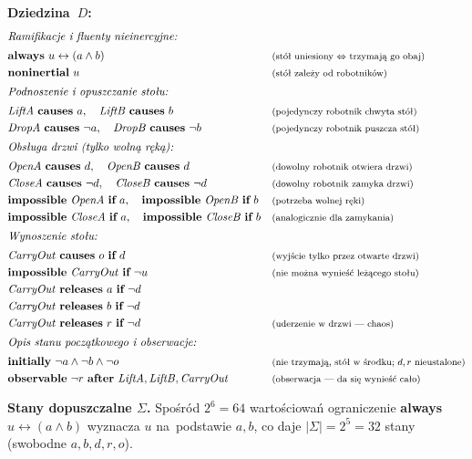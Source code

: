 \documentclass[11pt,a4paper]{article}
\newcommand{\causes}{\textbf{causes}}
\newcommand{\aft}{\textbf{after}}
\renewcommand{\iff}{\textbf{if}}
\newcommand{\initially}{\textbf{initially}}
\newcommand{\always}{\textbf{always}}
\newcommand{\impossible}{\textbf{impossible}}
\newcommand{\releases}{\textbf{releases}}
\newcommand{\noninertial}{\textbf{noninertial}}
\newcommand{\observable}{\textbf{observable}}
\newcommand{\cmt}[1]{\text{\footnotesize\normalfont (#1)}}
\theoremstyle{definition}
\begin{document}
\medskip
\noindent\textbf{Dziedzina~$D$:}
{\small
\begin{align*}
  \shortintertext{\textit{Ramifikacje i~fluenty nieinercyjne:}}
  &\always\ u \leftrightarrow (a \land b)
    && \cmt{stół uniesiony $\Leftrightarrow$ trzymają go obaj} \\
  &\noninertial\ u
    && \cmt{stół zależy od~robotników} \\
  \shortintertext{\textit{Podnoszenie i~opuszczanie stołu:}}
  &\mathit{LiftA}\ \causes\ a,
   \quad \mathit{LiftB}\ \causes\ b
    && \cmt{pojedynczy robotnik chwyta stół} \\
  &\mathit{DropA}\ \causes\ \neg a,
   \quad \mathit{DropB}\ \causes\ \neg b
    && \cmt{pojedynczy robotnik puszcza stół} \\
  \shortintertext{\textit{Obsługa drzwi (tylko wolną ręką):}}
  &\mathit{OpenA}\ \causes\ d,
   \quad \mathit{OpenB}\ \causes\ d
    && \cmt{dowolny robotnik otwiera drzwi} \\
  &\mathit{CloseA}\ \causes\ \neg d,
   \quad \mathit{CloseB}\ \causes\ \neg d
    && \cmt{dowolny robotnik zamyka drzwi} \\
  &\impossible\ \mathit{OpenA}\ \iff\ a,
   \quad \impossible\ \mathit{OpenB}\ \iff\ b
    && \cmt{potrzeba wolnej ręki} \\
  &\impossible\ \mathit{CloseA}\ \iff\ a,
   \quad \impossible\ \mathit{CloseB}\ \iff\ b
    && \cmt{analogicznie dla zamykania} \\
  \shortintertext{\textit{Wynoszenie stołu:}}
  &\mathit{CarryOut}\ \causes\ o\ \iff\ d
    && \cmt{wyjście tylko przez otwarte drzwi} \\
  &\impossible\ \mathit{CarryOut}\ \iff\ \neg u
    && \cmt{nie można wynieść leżącego stołu} \\
  &\mathit{CarryOut}\ \releases\ a\ \iff\ \neg d \\
  &\mathit{CarryOut}\ \releases\ b\ \iff\ \neg d \\
  &\mathit{CarryOut}\ \releases\ r\ \iff\ \neg d
    && \cmt{uderzenie w~drzwi --- chaos} \\
  \shortintertext{\textit{Opis stanu początkowego i~obserwacje:}}
  &\initially\ \neg a \land \neg b \land \neg o
    && \cmt{nie trzymają, stół w~środku; $d,r$ nieustalone} \\
  &\observable\ \neg r\ \aft\ \mathit{LiftA}, \mathit{LiftB}, \mathit{CarryOut}
    && \cmt{obserwacja --- da się wynieść cało}
\end{align*}
}

\medskip
\noindent\textbf{Stany dopuszczalne $\Sigma$.}
Spośród $2^6 = 64$ wartościowań ograniczenie \always{} $u \leftrightarrow (a \land b)$
wyznacza $u$ na~podstawie $a, b$, co daje $|\Sigma| = 2^5 = 32$ stany
(swobodne $a, b, d, r, o$).
\end{document}
